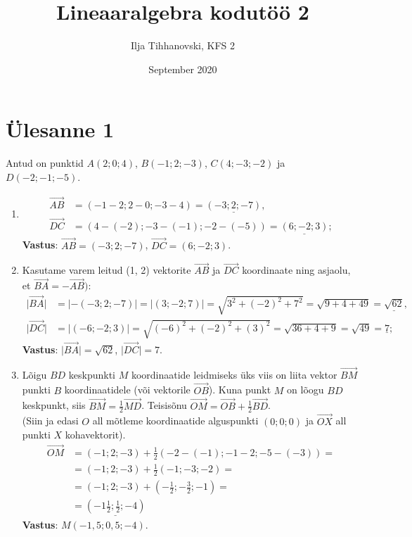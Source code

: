 \documentclass[10pt, a4paper]{article}
\title{Lineaaralgebra kodutöö 2}
\author{Ilja Tihhanovski, KFS 2}
\date{September 2020}
\begin{document}


\section{Ülesanne 1}
Antud on punktid $A(2; 0; 4)$, $B(−1; 2; −3)$, $C(4; −3; −2)$ ja $D(−2; −1; −5)$.
\begin{enumerate}

\item 
\begin{align}
    \vec{AB} &= (-1 - 2; 2 - 0; -3 - 4) = \underline{(-3; 2; -7)},\\
    \vec{DC} &= (4 - (-2); -3 - (-1); -2 - (-5)) = \underline{(6; -2; 3)};
\end{align}
\textbf{Vastus}: $\vec{AB} = (-3; 2; -7)$, $\vec{DC} = (6; -2; 3)$.

\item
Kasutame varem leitud (1, 2) vektorite $\vec{AB}$ ja $\vec{DC}$ koordinaate ning asjaolu, et $\vec{BA} = -\vec{AB})$:
\begin{align}
    \nonumber
    \lvert\vec{BA}\rvert &= \lvert-(-3; 2; -7)\rvert = \lvert(3; -2; 7)\rvert = \sqrt{3^2 + (-2)^2 + 7^2} = \sqrt{9 + 4 + 49} = \underline{\sqrt{62}},\\
    \nonumber
    \lvert\vec{DC}\rvert &= \lvert(-6; -2; 3)\rvert = \sqrt{(-6)^2 + (-2)^2 + (3)^2} = \sqrt{36 + 4 + 9} =  \sqrt{49} = \underline{7};
\end{align}
\textbf{Vastus}: $\lvert\vec{BA}\rvert = \sqrt{62}$, $\lvert\vec{DC}\rvert = 7$.

\item
Lõigu $BD$ keskpunkti $M$ koordinaatide leidmiseks üks viis on liita vektor $\vec{BM}$ punkti $B$ koordinaatidele (või vektorile $\vec{OB}$). Kuna punkt $M$ on lõogu $BD$ keskpunkt, siis $\vec{BM} = \frac{1}{2}\vec{MD}$. Teisisõnu $\vec{OM} = \vec{OB} + \frac{1}{2}\vec{BD}$.\\
(Siin ja edasi $O$ all mõtleme koordinaatide alguspunkti $(0; 0; 0)$ ja $\vec{OX}$ all punkti $X$ kohavektorit).
\begin{align}
    \nonumber
    \vec{OM} &= (-1; 2; -3) + \frac{1}{2}(-2-(-1); -1-2; -5-(-3)) = \\
    \nonumber
    &=(-1; 2; -3) + \frac{1}{2}(-1; -3; -2) = \\
    \nonumber
    &=(-1; 2; -3) + (-\frac{1}{2}; -\frac{3}{2}; -1) = \\
    \nonumber
    &=\underline{(-1\frac{1}{2}; \frac{1}{2}; -4)}
\end{align}
\textbf{Vastus}: $M(-1,5; 0,5; -4)$.


\end{enumerate}
\end{document}
